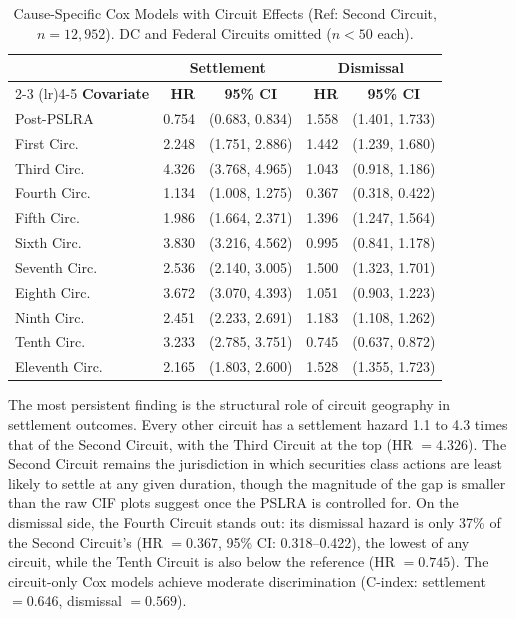 \begin{table}[htbp]
\centering
\caption[Cause-Specific Cox Models with Circuit Effects]{Cause-Specific Cox Models with Circuit Effects (Ref: Second Circuit, $n = 12{,}952$). DC and Federal Circuits omitted ($n < 50$ each).}
\label{tab:cox_circuit}
\renewcommand{\arraystretch}{1.2}
\begin{tabular*}{\textwidth}{@{\extracolsep{\fill}} l r c r c @{}}
\toprule
& \multicolumn{2}{c}{\textbf{Settlement}} & \multicolumn{2}{c}{\textbf{Dismissal}} \\
\cmidrule(lr){2-3} \cmidrule(lr){4-5}
\textbf{Covariate} & \textbf{HR} & \textbf{95\% CI} & \textbf{HR} & \textbf{95\% CI} \\
\midrule
Post-PSLRA    & 0.754 & (0.683, 0.834)
              & 1.558 & (1.401, 1.733) \\
First Circ.   & 2.248 & (1.751, 2.886)
              & 1.442 & (1.239, 1.680) \\
Third Circ.   & 4.326 & (3.768, 4.965)
              & 1.043 & (0.918, 1.186) \\
Fourth Circ.  & 1.134 & (1.008, 1.275)
              & 0.367 & (0.318, 0.422) \\
Fifth Circ.   & 1.986 & (1.664, 2.371)
              & 1.396 & (1.247, 1.564) \\
Sixth Circ.   & 3.830 & (3.216, 4.562)
              & 0.995 & (0.841, 1.178) \\
Seventh Circ. & 2.536 & (2.140, 3.005)
              & 1.500 & (1.323, 1.701) \\
Eighth Circ.  & 3.672 & (3.070, 4.393)
              & 1.051 & (0.903, 1.223) \\
Ninth Circ.   & 2.451 & (2.233, 2.691)
              & 1.183 & (1.108, 1.262) \\
Tenth Circ.   & 3.233 & (2.785, 3.751)
              & 0.745 & (0.637, 0.872) \\
Eleventh Circ.& 2.165 & (1.803, 2.600)
              & 1.528 & (1.355, 1.723) \\
\bottomrule
\end{tabular*}
\end{table}

The most persistent finding is the structural role of
circuit geography in settlement outcomes. Every other
circuit has a settlement hazard 1.1 to 4.3 times that of
the Second Circuit, with the Third Circuit at the top
(HR $= 4.326$). The Second Circuit remains the jurisdiction
in which securities class actions are least likely to settle
at any given duration, though the magnitude of the gap is
smaller than the raw CIF plots suggest once the PSLRA is
controlled for. On the dismissal side, the Fourth Circuit
stands out: its dismissal hazard is only 37\% of the
Second Circuit's (HR $= 0.367$, 95\% CI: 0.318--0.422),
the lowest of any circuit, while the Tenth Circuit is also
below the reference (HR $= 0.745$). The circuit-only Cox
models achieve moderate discrimination (C-index:
settlement $= 0.646$, dismissal $= 0.569$).

